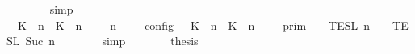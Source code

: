 \begin{isabellebody}
\ \ \ \ \ \ \isamarkupfalse%
\ simp\isanewline
\ \ \ \ \isamarkupfalse%
\ \isamarkupfalse%
\ {\isacartoucheopen}{\isasymlbrakk}\ {\isacharparenleft}{\isacharparenleft}K\ {\isasymUp}\ n{\isacharparenright}\ {\isacharhash}\ {\isacharparenleft}K\ {\isasymDown}\ n\ {\isacharat}\ {\isasymtau}{\isacharparenright}\ {\isacharhash}\ {\isasymGamma}{\isacharparenright}{\isacharcomma}\ n\ {\isasymturnstile}\ {\isasymPsi}\ {\isasymtriangleright}\ {\isasymPhi}\ {\isasymrbrakk}\isactrlsub c\isactrlsub o\isactrlsub n\isactrlsub f\isactrlsub i\isactrlsub g\ {\isacharequal}\ {\isasymlbrakk}{\isasymlbrakk}\ {\isacharparenleft}{\isacharparenleft}K\ {\isasymUp}\ n{\isacharparenright}\ {\isacharhash}\ {\isacharparenleft}K\ {\isasymDown}\ n\ {\isacharat}\ {\isasymtau}{\isacharparenright}\ {\isacharhash}\ {\isasymGamma}{\isacharparenright}\ {\isasymrbrakk}{\isasymrbrakk}\isactrlsub p\isactrlsub r\isactrlsub i\isactrlsub m\ {\isasyminter}\ {\isasymlbrakk}{\isasymlbrakk}\ {\isasymPsi}\ {\isasymrbrakk}{\isasymrbrakk}\isactrlsub T\isactrlsub E\isactrlsub S\isactrlsub L\isactrlbsup {\isasymge}\ n\isactrlesup \ {\isasyminter}\ {\isasymlbrakk}{\isasymlbrakk}\ {\isasymPhi}\ {\isasymrbrakk}{\isasymrbrakk}\isactrlsub T\isactrlsub E\isactrlsub S\isactrlsub L\isactrlbsup {\isasymge}\ Suc\ n\isactrlesup {\isacartoucheclose}\isanewline
\ \ \ \ \ \ \isamarkupfalse%
\ simp\isanewline
\ \ \ \ \isamarkupfalse%
\ \isamarkupfalse%
\ {\isacharquery}thesis\isanewline
\ \ \ \ \isamarkupfalse%
\ {\isacharminus}\isanewline
\ \ \ \ \ \ \isamarkupfalse%

\end{isabellebody}
